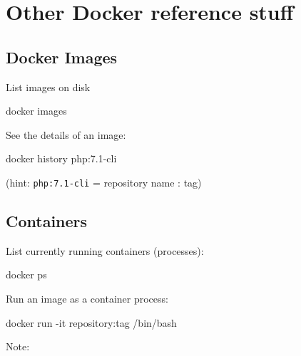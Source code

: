 \documentclass[a4paperpaper,openright]{book}
\newenvironment{Shaded}{}{}
\newcommand{\ExtensionTok}[1]{#1}
\newcommand{\NormalTok}[1]{#1}
\begin{document}
\hypertarget{other-docker-reference-stuff}{%
\section{Other Docker reference
stuff}\label{other-docker-reference-stuff}}

\hypertarget{docker-images}{%
\subsection{Docker Images}\label{docker-images}}

List images on disk

\begin{Shaded}
\begin{Highlighting}[]
    \ExtensionTok{docker}\NormalTok{ images}
\end{Highlighting}
\end{Shaded}

See the details of an image:

\begin{Shaded}
\begin{Highlighting}[]
    \ExtensionTok{docker}\NormalTok{ history php:7.1-cli}
\end{Highlighting}
\end{Shaded}

(hint: \texttt{php:7.1-cli} = repository name : tag)

\hypertarget{containers}{%
\subsection{Containers}\label{containers}}

List currently running containers (processes):

\begin{Shaded}
\begin{Highlighting}[]
    \ExtensionTok{docker}\NormalTok{ ps}
\end{Highlighting}
\end{Shaded}

Run an image as a container process:

\begin{Shaded}
\begin{Highlighting}[]
    \ExtensionTok{docker}\NormalTok{ run -it repository:tag /bin/bash}
\end{Highlighting}
\end{Shaded}

Note:
\end{document}
